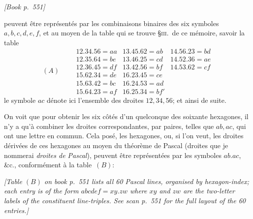 \documentclass[11pt]{article}
\begin{document}
\medskip
\noindent\textit{[Book p.~551]}\hfill

\smallskip

\noindent peuvent \^etre repr\'esent\'es par les combinaisons binaires des six symboles $a, b, c, d, e, f$, et au moyen de la table qui se trouve \S\;\textsc{iii}.\ de ce m\'emoire, savoir la table
\[
(A)\qquad
\begin{array}{lll}
12.34.56 = aa & 13.45.62 = ab & 14.56.23 = bd\\
12.35.64 = be & 13.46.25 = cd & 14.52.36 = ae\\
12.36.45 = df & 13.42.56 = bf & 14.53.62 = cf\\
15.62.34 = de & 16.23.45 = ce & \\
15.63.42 = bc & 16.24.53 = ad & \\
15.64.23 = af & 16.25.34 = bf' &
\end{array}
\]
le symbole $ac$ d\'enote ici l'ensemble des droites $12, 34, 56$; et ainsi de suite.

On voit que pour obtenir les six c\^ot\'es d'un quelconque des soixante hexagones, il n'y a qu'\`a combiner les droites correspondantes, par paires, telles que $ab, ac$, qui ont une lettre en commun. Cela pos\'e, les hexagones, ou, si l'on veut, les droites d\'eriv\'ees de ces hexagones au moyen du th\'eor\`eme de Pascal (droites que je nommerai \emph{droites de Pascal}), peuvent \^etre repr\'esent\'ees par les symboles $ab.ac$, \&c., conform\'ement \`a la table~$(B)$:

\textit{[Table $(B)$ on book p.~551 lists all 60 Pascal lines, organised by hexagon-index; each entry is of the form $abcdef = xy.zw$ where $xy$ and $zw$ are the two-letter labels of the constituent line-triples. See scan p.~551 for the full layout of the 60 entries.]}
\end{document}
